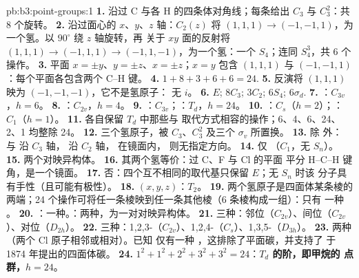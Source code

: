 \begin{solution}{pb:b3:point-groups:1}
\textbf{1.} 沿过 C 与各 H 的四条体对角线；每条给出
$C_3$ 与 $C_3^2$：共 8 个旋转。
\textbf{2.} 沿过面心的 $x$、$y$、$z$ 轴：$C_2(z)$ 将 $(1,1,1)
\to (-1,-1,1)$，为一个氢。以 $90^\circ$ 绕 $z$ 轴旋转，再
关于 $xy$ 面的反射将 $(1,1,1) \to (-1,1,1) \to (-1,1,-1)$，为一个氢：一个
$S_4$；连同 $S_4^3$，共 6 个操作。
\textbf{3.} 平面 $x = \pm y$、$y = \pm z$、$x = \pm z$；$x = y$ 包含
$(1,1,1)$ 与 $(-1,-1,1)$：每个平面各包含两个 C--H 键。
\textbf{4.} $1 + 8 + 3 + 6 + 6 = 24$.
\textbf{5.} 反演将 $(1,1,1)$ 映为 $(-1,-1,-1)$，它不是氢原子：
无 $i$。
\textbf{6.} $E$; $8C_3$; $3C_2$; $6S_4$; $6\sigma_d$.
\textbf{7.} ：$C_{3v}$，$h = 6$。
\textbf{8.} ：$C_{2v}$，$h = 4$。
\textbf{9.} ：$C_{3v}$；：$T_d$，$h = 24$。
\textbf{10.} ：$C_s$（$h = 2$）；：$C_1$（$h = 1$）。
\textbf{11.} 各自保留 $T_d$ 中那些与
取代方式相容的操作；6、4、6、24、2、1 均整除 24。
\textbf{12.} 三个氢原子，被 $C_3$、$C_3^2$ 及三个
$\sigma_v$ 所置换。
\textbf{13.} 除  外： 与  沿 $C_3$ 轴，
 沿 $C_2$ 轴， 在镜面内，
 则无指定方向。
\textbf{14.} 仅 （$C_1$，无 $S_n$）。
\textbf{15.} 两个对映异构体。
\textbf{16.} 其两个氢等价：过 C、F 与 Cl 的平面
平分 H--C--H 键角，是一个镜面。
\textbf{17.} 否：四个互不相同的取代基只保留 $E$；无 $S_n$ 时该
分子具有手性（且可能有极性）。
\textbf{18.} $(x, y, z)$：$T_2$。
\textbf{19.} 两个氢原子是四面体某条棱的两端；24
个操作可将任一条棱映到任一条其他棱（6 条棱构成一组）：只有
一种 。
\textbf{20.} ：一种。：两种，为一对对映异构体。
\textbf{21.} 三种：邻位（$C_{2v}$）、间位（$C_{2v}$）、对位（$D_{2h}$）。
\textbf{22.} 三种：1,2,3-（$C_{2v}$）、1,2,4-（$C_s$）、1,3,5-（$D_{3h}$）。
\textbf{23.} 两种（两个 Cl 原子相邻或相对）。已知
仅有一种 ，这排除了平面碳，并支持了
于 1874 年提出的四面体碳。
\textbf{24.} $1^2 + 1^2 + 2^2 + 3^2 + 3^2 = 24$：\textbf{$T_d$ 的阶，即甲烷的
点群，$h = 24$}。
\end{solution}
